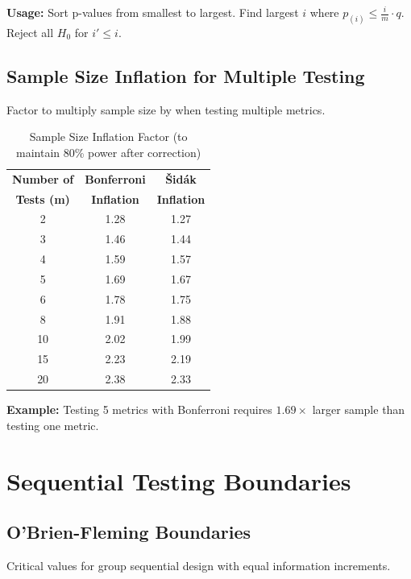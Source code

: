 \textbf{Usage:} Sort p-values from smallest to largest. Find largest $i$ where $p_{(i)} \leq \frac{i}{m} \cdot q$. Reject all $H_0$ for $i' \leq i$.

\subsection{Sample Size Inflation for Multiple Testing}

Factor to multiply sample size by when testing multiple metrics.

\begin{table}[h]
\centering
\caption{Sample Size Inflation Factor (to maintain 80\% power after correction)}
\begin{tabular}{ccc}
\toprule
\textbf{Number of} & \textbf{Bonferroni} & \textbf{Šidák} \\
\textbf{Tests (m)} & \textbf{Inflation} & \textbf{Inflation} \\
\midrule
2 & 1.28 & 1.27 \\
3 & 1.46 & 1.44 \\
4 & 1.59 & 1.57 \\
5 & 1.69 & 1.67 \\
6 & 1.78 & 1.75 \\
8 & 1.91 & 1.88 \\
10 & 2.02 & 1.99 \\
15 & 2.23 & 2.19 \\
20 & 2.38 & 2.33 \\
\bottomrule
\end{tabular}
\end{table}

\textbf{Example:} Testing 5 metrics with Bonferroni requires $1.69 \times$ larger sample than testing one metric.

\newpage

\section{Sequential Testing Boundaries}

\subsection{O'Brien-Fleming Boundaries}

Critical values for group sequential design with equal information increments.

